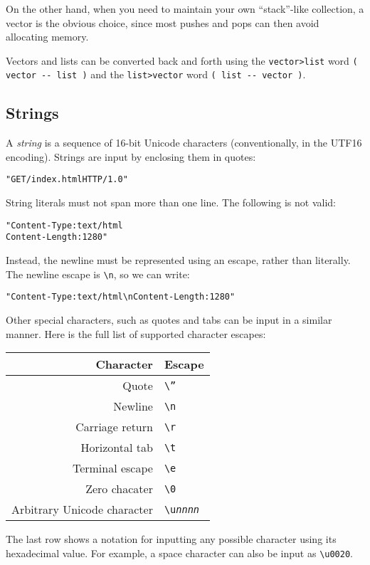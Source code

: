 \documentclass[english]{article}
\providecommand{\tabularnewline}{\\}
\begin{document}
On the other hand, when you need to maintain your own {}``stack''-like
collection, a vector is the obvious choice, since most pushes and
pops can then avoid allocating memory.

Vectors and lists can be converted back and forth using the \texttt{vector>list}
word \texttt{( vector -{}- list )} and the \texttt{list>vector} word
\texttt{( list -{}- vector )}.

\subsection{Strings}

A \emph{string} is a sequence of 16-bit Unicode characters (conventionally,
in the UTF16 encoding). Strings are input by enclosing them in quotes:

\begin{alltt}
"GET /index.html HTTP/1.0"
\end{alltt}
String literals must not span more than one line. The following is
not valid:

\begin{alltt}
"Content-Type: text/html
Content-Length: 1280"
\end{alltt}
Instead, the newline must be represented using an escape, rather than
literally. The newline escape is \texttt{\textbackslash{}n}, so we
can write:

\begin{alltt}
"Content-Type: text/html\textbackslash{}nContent-Length: 1280"
\end{alltt}
Other special characters, such as quotes and tabs can be input in
a similar manner. Here is the full list of supported character escapes:

\begin{tabular}{|r|l|}
\hline 
Character&
Escape\tabularnewline
\hline
\hline 
Quote&
\texttt{\textbackslash{}''}\tabularnewline
\hline 
Newline&
\texttt{\textbackslash{}n}\tabularnewline
\hline 
Carriage return&
\texttt{\textbackslash{}r}\tabularnewline
\hline 
Horizontal tab&
\texttt{\textbackslash{}t}\tabularnewline
\hline 
Terminal escape&
\texttt{\textbackslash{}e}\tabularnewline
\hline 
Zero chacater&
\texttt{\textbackslash{}0}\tabularnewline
\hline 
Arbitrary Unicode character&
\texttt{\textbackslash{}u}\texttt{\emph{nnnn}}\tabularnewline
\hline
\end{tabular}

The last row shows a notation for inputting any possible character
using its hexadecimal value. For example, a space character can also
be input as \texttt{\textbackslash{}u0020}.
\end{document}
